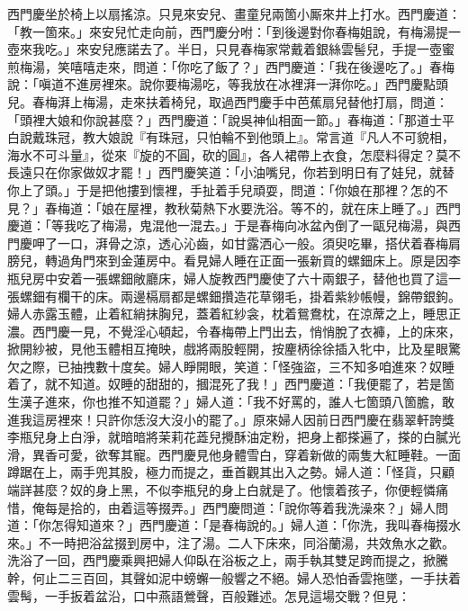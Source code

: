 西門慶坐於椅上以扇搖涼。只見來安兒、畫童兒兩箇小厮來井上打水。西門慶道：「教一箇來。」來安兒忙走向前，西門慶分咐：「到後邊對你春梅姐說，有梅湯提一壺來我吃。」來安兒應諾去了。半日，只見春梅家常戴着銀絲雲髻兒，手提一壺蜜煎梅湯，笑嘻嘻走來，{}問道：「你吃了飯了？」西門慶道：「我在後邊吃了。」春梅說：「嗔道不進房裡來。說你要梅湯吃，等我放在冰裡湃一湃你吃。」{}西門慶點頭兒。春梅湃上梅湯，走來扶着椅兒，取過西門慶手中芭蕉扇兒替他打扇，{}問道：「頭裡大娘和你說甚麼？」{}西門慶道：「說吳神仙相面一節。」春梅道：「那道士平白說戴珠冠，教大娘說『有珠冠，只怕輪不到他頭上』。常言道『凡人不可貌相，海水不可斗量』，從來『旋的不圓，砍的圓』，各人裙帶上衣食，怎麼料得定？莫不長遠只在你家做奴才罷！」{}{}西門慶笑道：「小油嘴兒，你若到明日有了娃兒，就替你上了頭。」于是把他摟到懷裡，手扯着手兒頑耍，問道：「你娘在那裡？怎的不見？」春梅道：「娘在屋裡，教秋菊熱下水要洗浴。等不的，就在床上睡了。」西門慶道：「等我吃了梅湯，鬼混他一混去。」于是春梅向冰盆內倒了一甌兒梅湯，與西門慶呷了一口，湃骨之涼，透心沁齒，如甘露洒心一般。須臾吃畢，搭伏着春梅肩膀兒，轉過角門來到金蓮房中。看見婦人睡在正面一張新買的螺鈿床上。原是因李瓶兒房中安着一張螺鈿敞廳床，婦人旋教西門慶使了六十兩銀子，替他也買了這一張螺鈿有欄干的床。兩邊槅扇都是螺鈿攢造花草翎毛，掛着紫紗帳幔，錦帶銀鉤。婦人赤露玉體，止着紅綃抹胸兒，{}蓋着紅紗衾，枕着鴛鴦枕，在涼蓆之上，睡思正濃。西門慶一見，不覺淫心頓起，令春梅帶上門出去，悄悄脫了衣褲，上的床來，掀開紗被，見他玉體相互掩映，戲將兩股輕開，按麈柄徐徐插入牝中，比及星眼驚欠之際，已抽拽數十度矣。婦人睜開眼，笑道：「怪強盜，三不知多咱進來？奴睡着了，就不知道。奴睡的甜甜的，摑混死了我！」{}西門慶道：「我便罷了，若是箇生漢子進來，你也推不知道罷？」{}婦人道：「我不好罵的，誰人七箇頭八箇膽，敢進我這房裡來！只許你恁沒大沒小的罷了。」原來婦人因前日西門慶在翡翠軒誇獎李瓶兒身上白淨，就暗暗將茉莉花蕋兒攪酥油定粉，把身上都搽遍了，{}搽的白膩光滑，異香可愛，欲奪其寵。西門慶見他身體雪白，穿着新做的兩隻大紅睡鞋。一面蹲踞在上，兩手兜其股，極力而提之，垂首觀其出入之勢。婦人道：「怪貨，只顧端詳甚麼？奴的身上黑，不似李瓶兒的身上白就是了。他懷着孩子，你便輕憐痛惜，俺每是拾的，由着這等掇弄。」{}西門慶問道：「說你等着我洗澡來？」婦人問道：「你怎得知道來？」西門慶道：「是春梅說的。」婦人道：「你洗，我叫春梅掇水來。」不一時把浴盆掇到房中，注了湯。二人下床來，同浴蘭湯，共效魚水之歡。洗浴了一回，西門慶乘興把婦人仰臥在浴板之上，兩手執其雙足跨而提之，掀騰𢵞幹，何止二三百回，其聲如泥中螃蠏一般響之不絕。婦人恐怕香雲拖墜，一手扶着雲髩，{}一手扳着盆沿，口中燕語鶯聲，百般難述。{}怎見這場交戰？但見：

